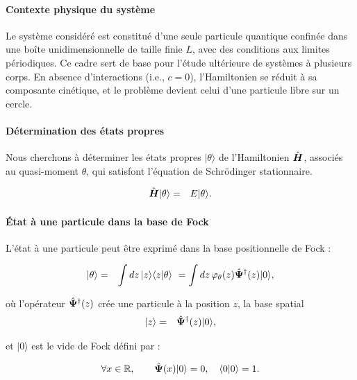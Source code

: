 \paragraph{Contexte physique du système}

Le système considéré est constitué d’une seule particule quantique confinée dans une boîte unidimensionnelle de taille finie \(L\), avec des conditions aux limites périodiques. Ce cadre sert de base pour l’étude ultérieure de systèmes à plusieurs corps. En absence d’interactions (i.e., \(c = 0\)), l’Hamiltonien se réduit à sa composante cinétique, et le problème devient celui d’une particule libre sur un cercle.


\paragraph{Détermination des états propres}

Nous cherchons à déterminer les états propres \(\vert \theta \rangle\) de l’Hamiltonien \(\hat{\bm{H}}\), associés au quasi-moment \(\theta\), qui satisfont l’équation de Schrödinger stationnaire.


\begin{eqnarray}
	\hat{\bm{H}} \vert \theta \rangle & = & E \vert \theta \rangle.
\end{eqnarray}

\paragraph{État à une particule dans la base de Fock}

L’état à une particule peut être exprimé dans la base positionnelle de Fock :

\begin{eqnarray}
	\vert \theta \rangle & = & \int dz\, \vert z \rangle \langle z \vert \theta \rangle ~= \int dz\, \varphi_{\theta}(z) \hat{\bm{\Psi}}^\dag(z) \vert 0 \rangle,
\end{eqnarray}

où l’opérateur \(\hat{\bm{\Psi}}^\dag(z)\) crée une particule à la position \(z\), la base spatial
\begin{eqnarray}
	\vert z \rangle  & = & \hat{\bm{\Psi}}^\dag (z)\vert 0 \rangle ,
\end{eqnarray}

et \(\vert 0 \rangle\) est le vide de Fock défini par :

\begin{eqnarray}
	\forall x \in \mathbb{R}, \qquad \hat{\bm{\Psi}}(x) \vert 0 \rangle = 0 ,\quad  \langle 0\vert 0 \rangle = 1. \label{chap:eq.vide.fock}
\end{eqnarray}

